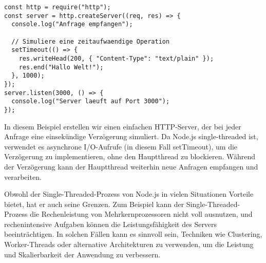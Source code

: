 \begin{lstlisting}[caption={Node.js Single Threaded},captionpos=b,label={lst:single}]
const http = require("http");
const server = http.createServer((req, res) => {
  console.log("Anfrage empfangen");

  // Simuliere eine zeitaufwaendige Operation
  setTimeout(() => {
    res.writeHead(200, { "Content-Type": "text/plain" });
    res.end("Hallo Welt!");
  }, 1000);
});
server.listen(3000, () => {
  console.log("Server laeuft auf Port 3000");
});
\end{lstlisting}
In diesem Beispiel erstellen wir einen einfachen HTTP-Server, der bei jeder Anfrage eine einsekündige Verzögerung simuliert. Da Node.js single-threaded ist, verwendet es asynchrone I/O-Aufrufe (in diesem Fall setTimeout), um die Verzögerung zu implementieren, ohne den Hauptthread zu blockieren. Während der Verzögerung kann der Hauptthread weiterhin neue Anfragen empfangen und verarbeiten.

Obwohl der Single-Threaded-Prozess von Node.js in vielen Situationen Vorteile bietet, hat er auch seine Grenzen. Zum Beispiel kann der Single-Threaded-Prozess die Rechenleistung von Mehrkernprozessoren nicht voll ausnutzen, und rechenintensive Aufgaben können die Leistungsfähigkeit des Servers beeinträchtigen. In solchen Fällen kann es sinnvoll sein, Techniken wie Clustering, Worker-Threads oder alternative Architekturen zu verwenden, um die Leistung und Skalierbarkeit der Anwendung zu verbessern.

